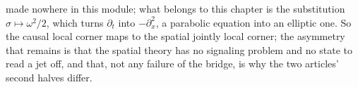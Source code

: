 \begin{remark}
made nowhere in this module; what belongs to this chapter is the substitution
$\sigma \mapsto \omega^2/2$, which turns $\partial_t$ into $-\partial_x^2$, a parabolic equation
into an elliptic one. So the causal local corner maps to the spatial jointly local corner; the
asymmetry that remains is that the spatial theory has no signaling problem and no state to read
a jet off, and that, not any failure of the bridge, is why the two articles' second halves
differ.
\end{remark}
